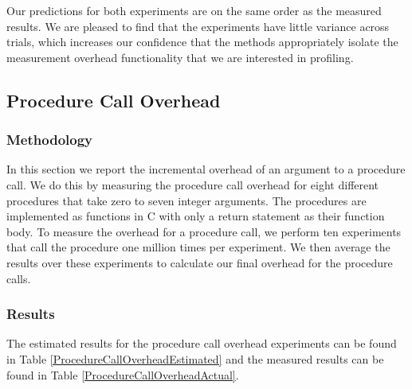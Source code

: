 \documentclass[sigconf]{acmart}
\begin{document}
Our predictions for both experiments are on the same order as the measured results. We are pleased to find that the experiments have little variance across trials, which increases our confidence that the methods appropriately isolate the measurement overhead functionality that we are interested in profiling.

\subsection{Procedure Call Overhead}
\subsubsection{Methodology} 
In this section we report the incremental overhead of an argument to a procedure call. We do this by measuring the procedure call overhead for eight different procedures that take zero to seven integer arguments. The procedures are implemented as functions in C with only a return statement as their function body. To measure the overhead for a procedure call, we perform ten experiments that call the procedure one million times per experiment. We then average the results over these experiments to calculate our final overhead for the procedure calls.

\subsubsection{Results}
The estimated results for the procedure call overhead experiments can be found in Table \ref{ProcedureCallOverheadEstimated} and the measured results can be found in Table \ref{ProcedureCallOverheadActual}.
\end{document}
